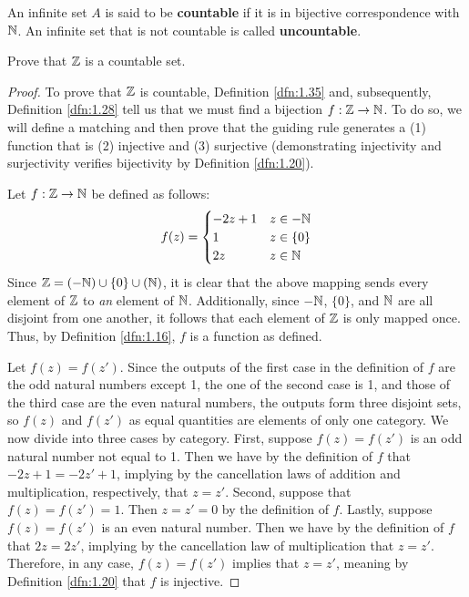 \documentclass[../main.tex]{subfiles}
\begin{document}
\begin{definition}\label{dfn:1.35}
    An infinite set $A$ is said to be \textbf{countable} if it is in bijective correspondence with $\mathbb{N}$. An infinite set that is not countable is called \textbf{uncountable}.
\end{definition}

\begin{exercise}\label{exr:1.36}
    Prove that $\mathbb{Z}$ is a countable set.
    \begin{proof}
        To prove that $\mathbb{Z}$ is countable, Definition \ref{dfn:1.35} and, subsequently, Definition \ref{dfn:1.28} tell us that we must find a bijection $f:\mathbb{Z}\to\mathbb{N}$. To do so, we will define a matching and then prove that the guiding rule generates a (1) function that is (2) injective and (3) surjective (demonstrating injectivity and surjectivity verifies bijectivity by Definition \ref{dfn:1.20}).\par
        Let $f:\mathbb{Z}\to\mathbb{N}$ be defined as follows:
        \begin{equation*}
            f(z) =
            \begin{cases}
                -2z+1 & z\in-\mathbb{N}\\
                1 & z\in\{0\}\\
                2z & z\in\mathbb{N}
            \end{cases}
        \end{equation*}
        Since $\mathbb{Z}=(-\mathbb{N})\cup\{0\}\cup(\mathbb{N})$, it is clear that the above mapping sends every element of $\mathbb{Z}$ to \emph{an} element of $\mathbb{N}$. Additionally, since $-\mathbb{N}$, $\{0\}$, and $\mathbb{N}$ are all disjoint from one another, it follows that each element of $\mathbb{Z}$ is only mapped once. Thus, by Definition \ref{dfn:1.16}, $f$ is a function as defined.\par
        Let $f(z)=f(z')$. Since the outputs of the first case in the definition of $f$ are the odd natural numbers except 1, the one of the second case is 1, and those of the third case are the even natural numbers, the outputs form three disjoint sets, so $f(z)$ and $f(z')$ as equal quantities are elements of only one category. We now divide into three cases by category. First, suppose $f(z)=f(z')$ is an odd natural number not equal to 1. Then we have by the definition of $f$ that $-2z+1=-2z'+1$, implying by the cancellation laws of addition and multiplication, respectively, that $z=z'$. Second, suppose that $f(z)=f(z')=1$. Then $z=z'=0$ by the definition of $f$. Lastly, suppose $f(z)=f(z')$ is an even natural number. Then we have by the definition of $f$ that $2z=2z'$, implying by the cancellation law of multiplication that $z=z'$. Therefore, in any case, $f(z)=f(z')$ implies that $z=z'$, meaning by Definition \ref{dfn:1.20} that $f$ is injective.\par

\end{proof}
\end{exercise}
\end{document}
